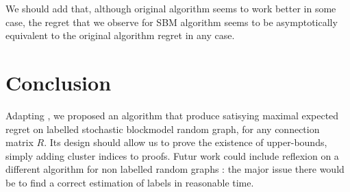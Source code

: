 \documentclass[11pt,a4paper]{article}
\begin{document}
We should add that, although original algorithm seems to work better in some case, the regret that we observe for SBM algorithm seems to be asymptotically equivalent to the original algorithm regret in any case.

\section{Conclusion}

Adapting \cite{valko}, we proposed an algorithm that produce satisying maximal expected regret on labelled stochastic blockmodel random graph, for any connection matrix $R$. Its design should allow us to prove the existence of upper-bounds, simply adding cluster indices to \cite{valko} proofs. Futur work could include reflexion on a different algorithm for non labelled random graphs : the major issue there would be to find a correct estimation of labels in reasonable time.


\end{document}

